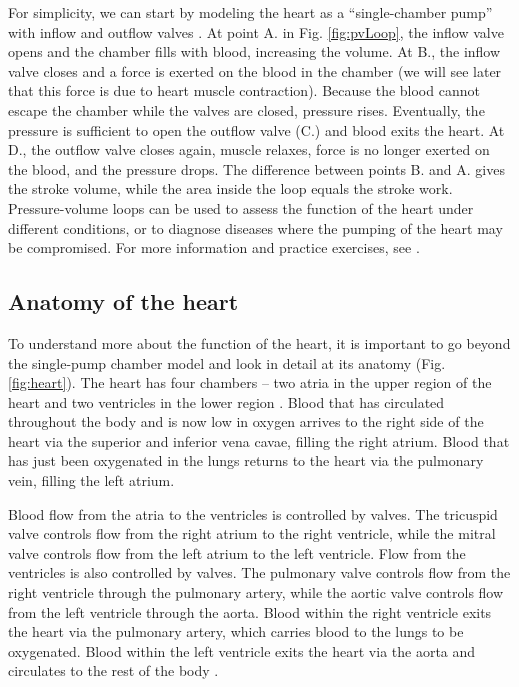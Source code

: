 \documentclass[12pt]{article}
\begin{document}
For simplicity, we can start by modeling the heart as a ``single-chamber pump'' with inflow and outflow valves \cite{khanWork}. At point A. in Fig. \ref{fig:pvLoop}, the inflow valve opens and the chamber fills with blood, increasing the volume. At B., the inflow valve closes and a force is exerted on the blood in the chamber (we will see later that this force is due to heart muscle contraction). Because the blood cannot escape the chamber while the valves are closed, pressure rises. Eventually, the pressure is sufficient to open the outflow valve (C.) and blood exits the heart. At D., the outflow valve closes again, muscle relaxes, force is no longer exerted on the blood, and the pressure drops. The difference between points B. and A. gives the stroke volume, while the area inside the loop equals the stroke work. Pressure-volume loops can be used to assess the function of the heart under different conditions, or to diagnose diseases where the pumping of the heart may be compromised. For more information and practice exercises, see \cite{khanPV}.

\subsection*{Anatomy of the heart}

To understand more about the function of the heart, it is important to go beyond the single-pump chamber model and look in detail at its anatomy (Fig. \ref{fig:heart}). The heart has four chambers -- two atria in the upper region of the heart and two ventricles in the lower region \cite{mohrman2006cardiovascular,khanHeart,openStaxHeart}. Blood that has circulated throughout the body and is now low in oxygen arrives to the right side of the heart via the superior and inferior vena cavae, filling the right atrium. Blood that has just been oxygenated in the lungs returns to the heart via the pulmonary vein, filling the left atrium. 

Blood flow from the atria to the ventricles is controlled by valves. The tricuspid valve controls flow from the right atrium to the right ventricle, while the mitral valve controls flow from the left atrium to the left ventricle. Flow from the ventricles is also controlled by valves. The pulmonary valve controls flow from the right ventricle through the pulmonary artery, while the aortic valve controls flow from the left ventricle through the aorta. Blood within the right ventricle exits the heart via the pulmonary artery, which carries blood to the lungs to be oxygenated. Blood within the left ventricle exits the heart via the aorta and circulates to the rest of the body \cite{mohrman2006cardiovascular,khanHeart,openStaxHeart}. 
\end{document}
